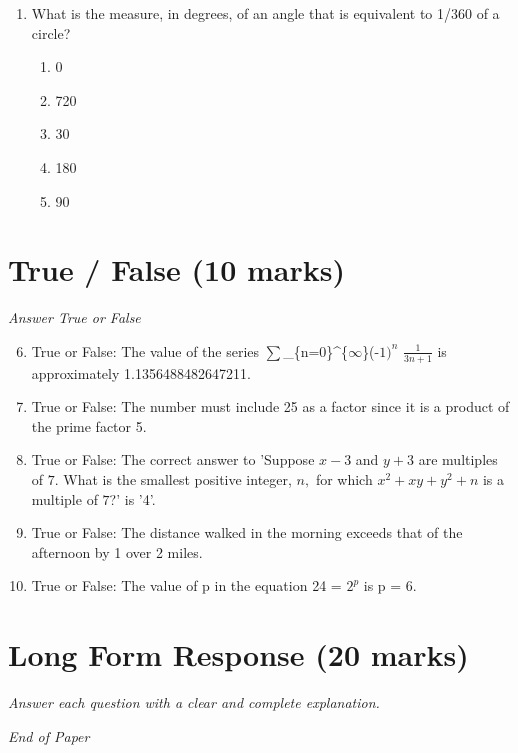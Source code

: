 \documentclass[12pt]{article}
\begin{document}
\begin{enumerate}[label=\arabic*.]
\begin{enumerate}[label=(\alph*)]
    \item \ensuremath{\sqrt{7}}
    \item 3\ensuremath{\sqrt{2}}
    \item 5\ensuremath{\sqrt{2}}
    \item 2
\end{enumerate}
\item What is the measure, in degrees, of an angle that is equivalent to 1/360 of a circle?
\begin{enumerate}[label=(\alph*)]
    \item 0
    \item 720
    \item 30
    \item 180
    \item 90
\end{enumerate}
\end{enumerate}

\section*{True / False (10 marks)}
\textit{Answer True or False}
\begin{enumerate}[label=\arabic*.]
\setcounter{enumi}{5}
\item True or False: The value of the series \ensuremath{\sum}\_\{n=0\}^\{\ensuremath{\infty}\}(-$1)^n$ \ensuremath{\frac{1}{3 n+1}} is approximately 1.1356488482647211.
\item True or False: The number must include 25 as a factor since it is a product of the prime factor 5.
\item True or False: The correct answer to 'Suppose $x-3$ and $y+3$ are multiples of $7$. What is the smallest positive integer, $n,$ for which $x^2+xy+y^2+n$ is a multiple of $7$?' is '4'.
\item True or False: The distance walked in the morning exceeds that of the afternoon by 1 over 2 miles.
\item True or False: The value of p in the equation 24 = $2^p$ is p = 6.
\end{enumerate}

\section*{Long Form Response (20 marks)}
\textit{Answer each question with a clear and complete explanation.}

\vfill
\noindent\textit{End of Paper}
\end{document}
